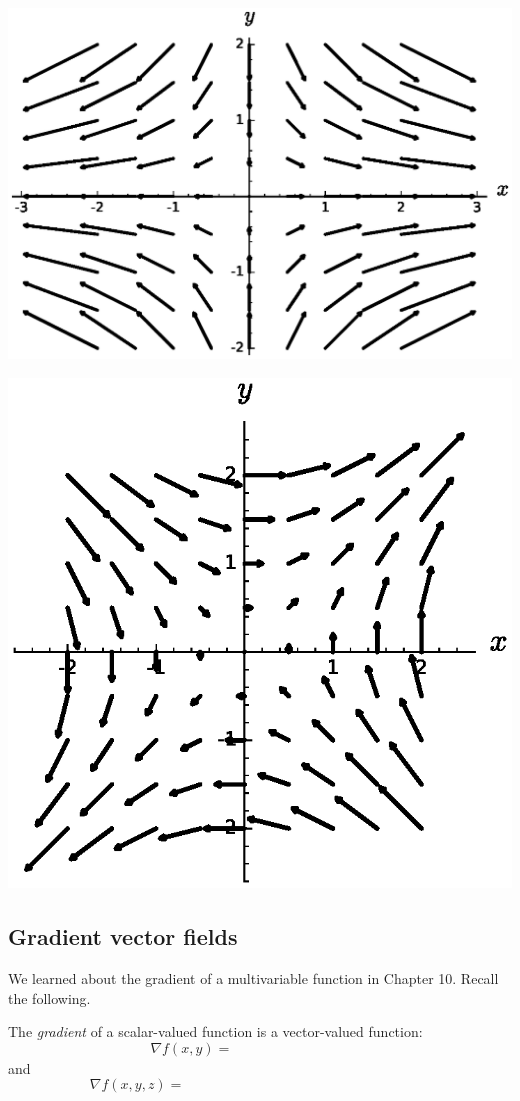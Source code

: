 \begin{ex}
    \begin{minipage}{.4\textwidth}
        \includegraphics[width=\textwidth]{images/mult3}
    \end{minipage}
    \hfill
    \begin{minipage}{.4\textwidth}
        \includegraphics[width=\textwidth]{images/mult4}
    \end{minipage}
\end{ex}

\subsection{Gradient vector fields}
We learned about the gradient of a multivariable function in Chapter 10. Recall the following.
\begin{defn}[Gradient]
    The \emph{gradient} of a scalar-valued function is a vector-valued function:
    \[
        \nabla f(x,y)=\phantom{\langle f_x(x,y),\, f_y(x,y)\rangle}
    \] 
    and 
    \[
        \nabla f(x,y,z)=\phantom{\langle f_x(x,y,z),\, f_y(x,y,z),\, f_z(x,y,z)\rangle.}
    \]
\end{defn}
\vfill 

